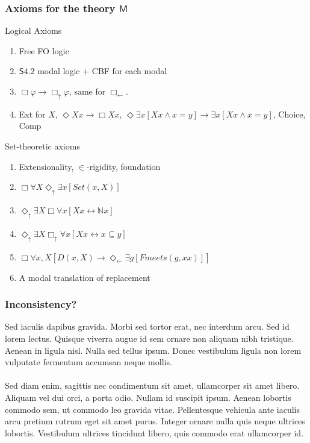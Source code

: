 \documentclass{beamer}
\newcommand{\du}{\Diamond_\uparrow}
\newcommand{\dl}{\Diamond_\leftarrow}
\newcommand{\bu}{\Box_\uparrow}
\newcommand{\bl}{\Box_\leftarrow}
\begin{document}
\begin{frame}
    \frametitle{Axioms for the theory $\mathsf{M}$}
    \begin{block}{Logical Axioms}
    \begin{enumerate}
        \item<2-> Free FO logic
        \item<3-> $\mathsf{S4.2}$ modal logic + CBF for each modal
        \item<4-> $\Box \varphi \rightarrow \bu \varphi$, same for $\bl$.
        \item<4-> Ext for $X$, $\Diamond Xx \rightarrow \Box Xx$, 
        $\Diamond \exists x[Xx \wedge x = y] \rightarrow \exists x[Xx \wedge x = y]$,
        Choice, Comp
    \end{enumerate}
    \end{block}
    \begin{block}{Set-theoretic axioms}
        \begin{enumerate}
        \item<6-> Extensionality, $\in$-rigidity, foundation
        \item<7-> $\Box \forall X \du \exists x [Set(x, X)]$
        \item<9-> $\du \exists X \Box \forall x[Xx \leftrightarrow \mathbb{N}x]$
        \item<10-> $\du \exists X \bu \forall x[Xx \leftrightarrow x \subseteq y]$
        \item<11-> $\Box \forall x, X [D(x, X)\rightarrow \dl \exists g[Fmeets(g, xx)]]$
        \item<12-> A modal translation of replacement
        \end{enumerate}
    \end{block}
\end{frame}
\begin{frame}
    \frametitle{Inconsistency?}
    Sed iaculis dapibus gravida. Morbi sed tortor erat, nec interdum arcu. Sed id lorem lectus. Quisque viverra augue id sem ornare non aliquam nibh tristique. Aenean in ligula nisl. Nulla sed tellus ipsum. Donec vestibulum ligula non lorem vulputate fermentum accumsan neque mollis.\\~\\
    
    Sed diam enim, sagittis nec condimentum sit amet, ullamcorper sit amet libero. Aliquam vel dui orci, a porta odio. Nullam id suscipit ipsum. Aenean lobortis commodo sem, ut commodo leo gravida vitae. Pellentesque vehicula ante iaculis arcu pretium rutrum eget sit amet purus. Integer ornare nulla quis neque ultrices lobortis. Vestibulum ultrices tincidunt libero, quis commodo erat ullamcorper id.
\end{frame}
\end{document}
